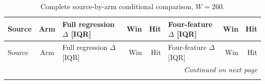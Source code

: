 \begingroup
\fontsize{9}{10.2}\selectfont
\setlength{\tabcolsep}{2.2pt}
\renewcommand{\arraystretch}{1.05}
\setlength{\LTpre}{2pt}
\setlength{\LTpost}{3pt}
\begin{longtable}{lcp{37mm}rrp{37mm}rr}
\caption{Complete source-by-arm conditional comparison, $W=260$.}\label{tab:v9-stability-w260}\\
\toprule
Source & Arm & Full regression $\Delta$ [IQR] & Win & Hit & Four-feature $\Delta$ [IQR] & Win & Hit\\
\midrule
\endfirsthead
\toprule
Source & Arm & Full regression $\Delta$ [IQR] & Win & Hit & Four-feature $\Delta$ [IQR] & Win & Hit\\
\midrule
\endhead
\midrule
\multicolumn{8}{r}{\emph{Continued on next page}}\\
\endfoot
\bottomrule
\endlastfoot

\end{longtable}
